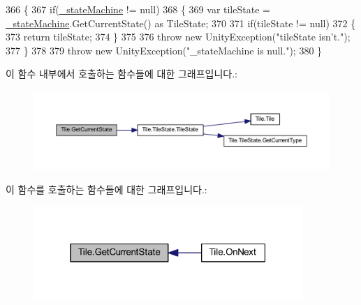 \begin{DoxyCode}
366     \{
367         \textcolor{keywordflow}{if}(\hyperlink{class_tile_a822a1bffe56b1193b8c5c61070ea7827}{\_stateMachine} != null)
368         \{
369             var tileState = \hyperlink{class_tile_a822a1bffe56b1193b8c5c61070ea7827}{\_stateMachine}.GetCurrentState() as TileState;
370 
371             \textcolor{keywordflow}{if}(tileState != null)
372             \{
373                 \textcolor{keywordflow}{return} tileState;
374             \}
375 
376             \textcolor{keywordflow}{throw} \textcolor{keyword}{new} UnityException(\textcolor{stringliteral}{"tileState isn't."});
377         \}
378 
379         \textcolor{keywordflow}{throw} \textcolor{keyword}{new} UnityException(\textcolor{stringliteral}{"\_stateMachine is null."});
380     \}
\end{DoxyCode}


이 함수 내부에서 호출하는 함수들에 대한 그래프입니다.\+:\nopagebreak
\begin{figure}[H]
\begin{center}
\leavevmode
\includegraphics[width=350pt]{class_tile_ae37e08e39263e766fdc612de94fb7a0d_cgraph}
\end{center}
\end{figure}




이 함수를 호출하는 함수들에 대한 그래프입니다.\+:\nopagebreak
\begin{figure}[H]
\begin{center}
\leavevmode
\includegraphics[width=289pt]{class_tile_ae37e08e39263e766fdc612de94fb7a0d_icgraph}
\end{center}
\end{figure}


